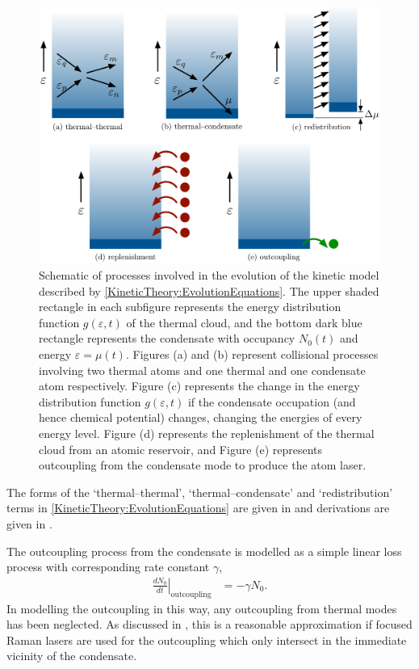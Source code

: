 \begin{figure}
    \centering
    \includegraphics[width=14cm]{ProcessDiagrams}
    \caption{Schematic of processes involved in the evolution of the kinetic model described by \eqref{KineticTheory:EvolutionEquations}.  The upper shaded rectangle in each subfigure represents the energy distribution function $g(\varepsilon, t)$ of the thermal cloud, and the bottom dark blue rectangle represents the condensate with occupancy $N_0(t)$ and energy $\varepsilon = \mu(t)$. Figures (a) and (b) represent collisional processes involving two thermal atoms and one thermal and one condensate atom respectively. Figure (c) represents the change in the energy distribution function $g(\varepsilon, t)$ if the condensate occupation (and hence chemical potential) changes, changing the energies of every energy level. Figure (d) represents the replenishment of the thermal cloud from an atomic reservoir, and Figure (e) represents outcoupling from the condensate mode to produce the atom laser.}
    \label{KineticTheory:ProcessDiagrams}
\end{figure}

The forms of the `thermal--thermal', `thermal--condensate' and `redistribution' terms in \eqref{KineticTheory:EvolutionEquations} are given in  and derivations are given in \citep{Bijlsma:2000}.

The outcoupling process from the condensate is modelled as a simple linear loss process with corresponding rate constant $\gamma$,
\begin{align}
    \left.\frac{d N_0}{d t}\right|_\text{outcoupling} &= - \gamma N_0.
    \label{KineticTheory:OutcouplingProcess}
\end{align}
In modelling the outcoupling in this way, any outcoupling from thermal modes has been neglected. As discussed in , this is a reasonable approximation if focused Raman lasers are used for the outcoupling which only intersect in the immediate vicinity of the condensate. 

